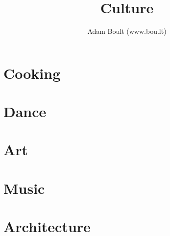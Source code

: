 \documentclass[oneside]{book}
\begin{document}
\author{Adam Boult (www.bou.lt)}
\title{Culture}
\maketitle

\setcounter{tocdepth}{1}
\tableofcontents



\part{Cooking}








\part{Dance}

\part{Art}

\part{Music}

\part{Architecture}
\end{document}
